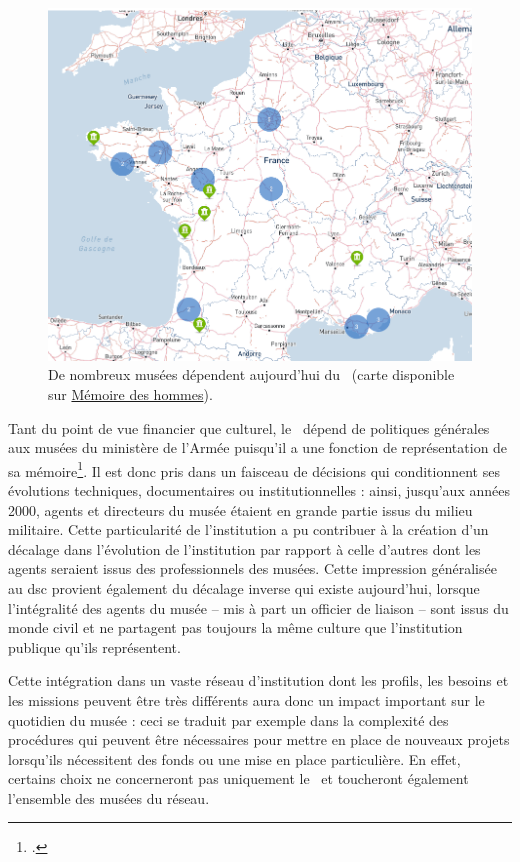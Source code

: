 \begin{figure}[htbp]
	\centering
	\includegraphics[width=\linewidth]{img/CART_musees_armee}
	\caption[Cartographie du réseau des musées du \minarm]{De nombreux musées dépendent aujourd'hui du \minarm~(carte disponible sur \href{https://www.memoiredeshommes.sga.defense.gouv.fr/musees-collections-et-mecenat/musees-et-monuments}{Mémoire des hommes}).}
	\label{fig:cart_musees}
\end{figure}


Tant du point de vue financier que culturel, le \mae~dépend de politiques générales aux musées du ministère de l'Armée puisqu'il a une fonction de représentation de sa mémoire\footcite{museedelairetdelespaceProjetScientifiqueCulturel2020}. Il est donc pris dans un faisceau de décisions qui conditionnent ses évolutions techniques, documentaires ou institutionnelles : ainsi, jusqu'aux années 2000, agents et directeurs du musée étaient en grande partie issus du milieu militaire. Cette particularité de l'institution a pu contribuer à la création d'un décalage dans l'évolution de l'institution  par rapport à celle d'autres dont les agents seraient issus des professionnels des musées. Cette impression généralisée au \ac{dsc} provient également du décalage inverse qui existe aujourd'hui, lorsque l'intégralité des agents du musée -- mis à part un officier de liaison -- sont issus du monde civil et ne partagent pas toujours la même culture que l'institution publique qu'ils représentent.

Cette intégration dans un vaste réseau d'institution dont les profils, les besoins et les missions peuvent être très différents aura donc un impact important sur le quotidien du musée : ceci se traduit par exemple dans la complexité des procédures qui peuvent être nécessaires pour mettre en place de nouveaux projets lorsqu'ils nécessitent des fonds ou une mise en place particulière. En effet, certains choix ne concerneront pas uniquement le \mae~et toucheront également l'ensemble des musées du réseau.
